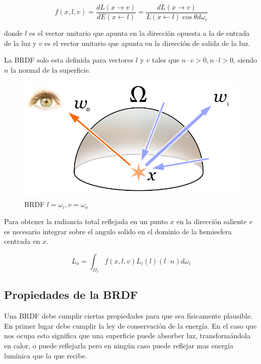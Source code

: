 \begin{equation}
f(x, l, v)=\frac{dL(x \to v)}{dE(x \gets l)} = \frac{dL(x \to v)}{L(x \gets l) \cos\theta d\omega_i} 
\end{equation}

donde $l$ es el vector unitario que apunta en la dirección opuesta a la de entrada de la luz y $v$ es el vector unitario que apunta en la dirección de salida de la luz.

La BRDF solo esta definida para vectores $l$ y $v$ tales que $n \cdot v > 0, n \cdot l > 0$, siendo $n$ la normal de la superficie.

\begin{figure}[h]
\centering
\includegraphics[scale=0.5]{Rendering_eq.png}
\caption{BRDF $l = \omega_i, v = \omega_o$ }
\end{figure}


Para obtener la radiancia total reflejada en un punto $x$ en la dirección saliente $v$ es necesario integrar sobre el angulo solido en el dominio de la hemiesfera centrada en $x$.

\begin{equation}
\label{eq:radiance_integral}
L _ o = \int_{\Omega_x} f(x, l, v) L_i(l) (l \cdot n) d\omega_i 
\end{equation}

\clearpage

\subsection{Propiedades de la BRDF}

Una BRDF debe cumplir ciertas propiedades para que sea físicamente plausible.
En primer lugar debe cumplir la ley de conservación de la energía. En el caso que nos ocupa esto significa que una superficie puede absorber luz, transformándola en calor, o puede reflejarla pero en ningún caso puede reflejar mas energía lumínica que la que recibe.

